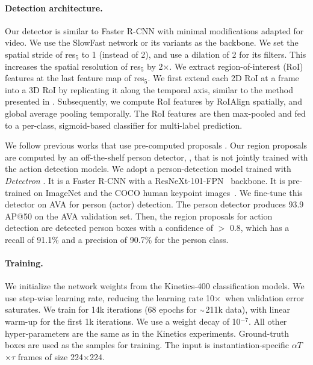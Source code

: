 \documentclass[10pt,twocolumn,letterpaper]{article}
\newcommand{\app}{\raise.17ex\hbox{$\scriptstyle\sim$}}
\def\x{$\times$}
\begin{document}
	\paragraph{Detection architecture.}
		Our detector is similar to Faster R-CNN \cite{Ren2015} with minimal modifications adapted for video.
	We use the SlowFast network or its variants as the backbone.
	We set the spatial stride of res$_5$ to 1 (instead of 2), and use a dilation of 2 for its filters. This increases the spatial resolution of res$_5$ by 2$\times$.
	We extract region-of-interest (RoI) features \cite{Girshick2015} at the last feature map of res$_5$.
	We first extend each 2D RoI at a frame into a 3D RoI by replicating it along the temporal axis, similar to the method presented in \cite{Gu2018}. Subsequently, we compute RoI features by RoIAlign \cite{He2017} spatially, and global average pooling temporally. The RoI features are then max-pooled and fed to a per-class, sigmoid-based classifier for multi-label prediction.
	
	We follow previous works that use pre-computed proposals \cite{Gu2018,Sun2018,Jiang2018}. Our region proposals are computed by an off-the-shelf person detector, \ie, that is not jointly trained with the action detection models.
	We adopt a person-detection model trained with \emph{Detectron} \cite{Detectron2018}. It is a Faster R-CNN with a ResNeXt-101-FPN~\cite{Xie2017,Lin2017} backbone.
	It is pre-trained on ImageNet and the COCO human keypoint images~\cite{Lin2014}.
	We fine-tune this detector on AVA for person (actor) detection.
	The person detector produces 93.9 AP@50 on the AVA validation set.
	Then, the region proposals for action detection are detected person boxes with a confidence of $>$ 0.8, which has a recall of 91.1\% and a precision of 90.7\% for the person class.
	
	\paragraph{Training.} We initialize the network weights from the Kinetics-400 classification models.
	We use step-wise learning rate, reducing the learning rate 10\x~when validation error saturates. 
	We train for 14k iterations (68 epochs for $\app$211k data), with linear warm-up \cite{Goyal2017} for the first 1k iterations. We use a weight decay of 10$^{-7}$. 
	All other hyper-parameters are the same as in the Kinetics experiments.
	Ground-truth boxes are used as the samples for training.
		The input is instantiation-specific $\alpha T$\x$\tau$ frames of size 224\x224.
	
\end{document}
